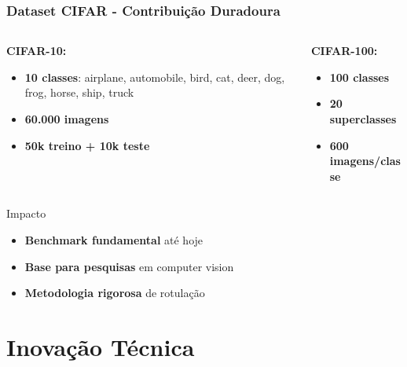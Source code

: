 \documentclass[aspectratio=169]{beamer}
\begin{document}
\begin{frame}
\frametitle{Dataset CIFAR - Contribuição Duradoura}
\begin{columns}
\begin{column}{0.5\textwidth}
\textbf{CIFAR-10:}
\begin{itemize}
    \item \textcolor{azulescuro}{\textbf{10 classes}}: airplane, automobile, bird, cat, deer, dog, frog, horse, ship, truck
    \item \textcolor{azulescuro}{\textbf{60.000 imagens}}
    \item \textcolor{azulescuro}{\textbf{50k treino + 10k teste}}
\end{itemize}
\end{column}
\begin{column}{0.5\textwidth}
\textbf{CIFAR-100:}
\begin{itemize}
    \item \textcolor{azulescuro}{\textbf{100 classes}}
    \item \textcolor{azulescuro}{\textbf{20 superclasses}}
    \item \textcolor{azulescuro}{\textbf{600 imagens/classe}}
\end{itemize}
\end{column}
\end{columns}

\begin{exampleblock}{Impacto}
\begin{itemize}
    \item \textcolor{azulescuro}{\textbf{Benchmark fundamental}} até hoje
    \item \textcolor{azulescuro}{\textbf{Base para pesquisas}} em computer vision
    \item \textcolor{azulescuro}{\textbf{Metodologia rigorosa}} de rotulação
\end{itemize}
\end{exampleblock}
\end{frame}

\section{Inovação Técnica}
\end{document}
